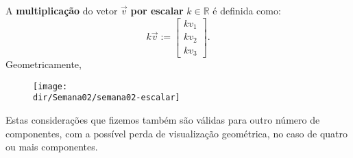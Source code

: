 \documentclass[../livro.tex]{subfiles}  %
\providecommand{\dir}{..}
\begin{document}
A \textbf{multiplicação} do vetor $\vec{v}$ \textbf{por escalar} $k \in \mathbb{R}$ é definida como:
\begin{equation}
k \vec{v} :=
\left[
  \begin{array}{c}
    k v_1 \\
    k v_2 \\
    k v_3
  \end{array}
\right].
\end{equation} Geometricamente,
\begin{figure}[h!]
\begin{center}
\texttt{[image: \\dir/Semana02/semana02-escalar]}
\end{center}
\end{figure}



Estas considerações que fizemos também são válidas para outro número de componentes, com a possível perda de visualização geométrica, no caso de quatro ou mais componentes.
\end{document}
